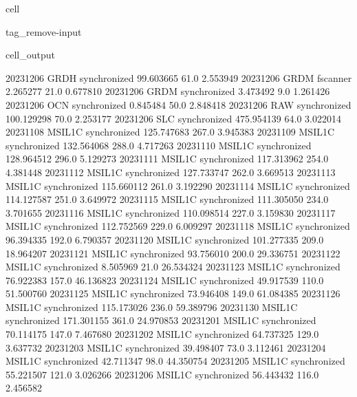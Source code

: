 \documentclass[letterpaper,10pt,english]{jupyterBook}
\begin{document}
\begin{sphinxuseclass}{cell}
\begin{sphinxuseclass}{tag_remove-input}
\begin{sphinxVerbatimOutput}
\begin{sphinxuseclass}{cell_output}
\begin{sphinxVerbatim}[commandchars=\\\{\}]
2023\PYGZhy{}12\PYGZhy{}06         GRDH  synchronized   99.603665    61.0    2.553949
2023\PYGZhy{}12\PYGZhy{}06         GRDM      fscanner    2.265277    21.0    0.677810
2023\PYGZhy{}12\PYGZhy{}06         GRDM  synchronized    3.473492     9.0    1.261426
2023\PYGZhy{}12\PYGZhy{}06          OCN  synchronized    0.845484    50.0    2.848418
2023\PYGZhy{}12\PYGZhy{}06          RAW  synchronized  100.129298    70.0    2.253177
2023\PYGZhy{}12\PYGZhy{}06          SLC  synchronized  475.954139    64.0    3.022014
2023\PYGZhy{}11\PYGZhy{}08       MSIL1C  synchronized  125.747683   267.0    3.945383
2023\PYGZhy{}11\PYGZhy{}09       MSIL1C  synchronized  132.564068   288.0    4.717263
2023\PYGZhy{}11\PYGZhy{}10       MSIL1C  synchronized  128.964512   296.0    5.129273
2023\PYGZhy{}11\PYGZhy{}11       MSIL1C  synchronized  117.313962   254.0    4.381448
2023\PYGZhy{}11\PYGZhy{}12       MSIL1C  synchronized  127.733747   262.0    3.669513
2023\PYGZhy{}11\PYGZhy{}13       MSIL1C  synchronized  115.660112   261.0    3.192290
2023\PYGZhy{}11\PYGZhy{}14       MSIL1C  synchronized  114.127587   251.0    3.649972
2023\PYGZhy{}11\PYGZhy{}15       MSIL1C  synchronized  111.305050   234.0    3.701655
2023\PYGZhy{}11\PYGZhy{}16       MSIL1C  synchronized  110.098514   227.0    3.159830
2023\PYGZhy{}11\PYGZhy{}17       MSIL1C  synchronized  112.752569   229.0    6.009297
2023\PYGZhy{}11\PYGZhy{}18       MSIL1C  synchronized   96.394335   192.0    6.790357
2023\PYGZhy{}11\PYGZhy{}20       MSIL1C  synchronized  101.277335   209.0   18.964207
2023\PYGZhy{}11\PYGZhy{}21       MSIL1C  synchronized   93.756010   200.0   29.336751
2023\PYGZhy{}11\PYGZhy{}22       MSIL1C  synchronized    8.505969    21.0   26.534324
2023\PYGZhy{}11\PYGZhy{}23       MSIL1C  synchronized   76.922383   157.0   46.136823
2023\PYGZhy{}11\PYGZhy{}24       MSIL1C  synchronized   49.917539   110.0   51.500760
2023\PYGZhy{}11\PYGZhy{}25       MSIL1C  synchronized   73.946408   149.0   61.084385
2023\PYGZhy{}11\PYGZhy{}26       MSIL1C  synchronized  115.173026   236.0   59.389796
2023\PYGZhy{}11\PYGZhy{}30       MSIL1C  synchronized  171.301155   361.0   24.970853
2023\PYGZhy{}12\PYGZhy{}01       MSIL1C  synchronized   70.114175   147.0    7.467680
2023\PYGZhy{}12\PYGZhy{}02       MSIL1C  synchronized   64.737325   129.0    3.637732
2023\PYGZhy{}12\PYGZhy{}03       MSIL1C  synchronized   39.498407    73.0    3.112461
2023\PYGZhy{}12\PYGZhy{}04       MSIL1C  synchronized   42.711347    98.0   44.350754
2023\PYGZhy{}12\PYGZhy{}05       MSIL1C  synchronized   55.221507   121.0    3.026266
2023\PYGZhy{}12\PYGZhy{}06       MSIL1C  synchronized   56.443432   116.0    2.456582

\end{sphinxVerbatim}
\end{sphinxuseclass}
\end{sphinxVerbatimOutput}
\end{sphinxuseclass}
\end{sphinxuseclass}
\end{document}
